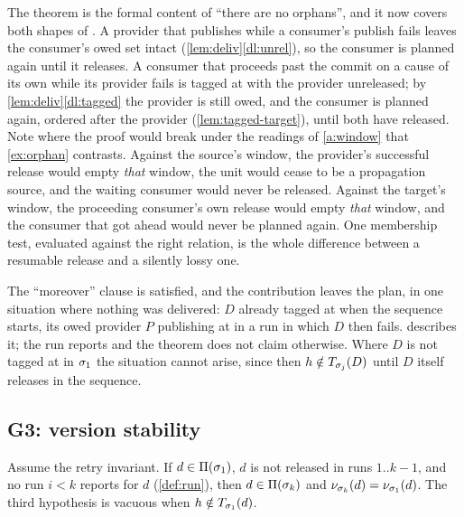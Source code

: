 The theorem is the formal content of ``there are no orphans'', and it now
covers both shapes of . A provider that publishes while a
consumer's publish fails leaves the consumer's owed set intact
(\cref{lem:deliv}\ref{dl:unrel}), so the consumer is planned again until it
releases. A consumer that proceeds past the commit on a cause of its own while
its provider fails is tagged at \Head{} with the provider unreleased; by
\cref{lem:deliv}\ref{dl:tagged} the provider is still owed, and the consumer is
planned again, ordered after the provider (\cref{lem:tagged-target}), until
both have released. Note where the proof would break under the readings of
\cref{a:window} that \cref{ex:orphan} contrasts. Against the source's window,
the provider's successful release would empty \emph{that} window, the unit
would cease to be a propagation source, and the waiting consumer would never
be released. Against the target's window, the proceeding consumer's own
release would empty \emph{that} window, and the consumer that got ahead would
never be planned again. One membership test, evaluated against the right
relation, is the whole difference between a resumable release and a silently
lossy one.

\begin{remark}
\label{rem:g2-loss}
The ``moreover'' clause is satisfied, and the contribution leaves the plan, in
one situation where nothing was delivered: $D$ already tagged at \Head{} when
the sequence starts, its owed provider $P$ publishing at \Head{} in a run in
which $D$ then fails.  describes it; the run reports
 and the theorem does not claim otherwise. Where $D$ is not tagged
at \Head{} in $\sigma_1$ the situation cannot arise, since then $h \notin
T_{\sigma_j}(D)$ until $D$ itself releases in the sequence.
\end{remark}

\subsection{G3: version stability}

\begin{theorem}
\label{thm:g3}
Assume the retry invariant. If $d \in \Pi(\sigma_1)$, $d$ is not released in
runs $1..k-1$, and no run $i < k$ reports  for $d$
(\cref{def:run}), then $d \in \Pi(\sigma_k)$ and $\nu_{\sigma_k}(d) =
\nu_{\sigma_1}(d)$. The third hypothesis is vacuous when $h \notin
T_{\sigma_1}(d)$.
\end{theorem}

